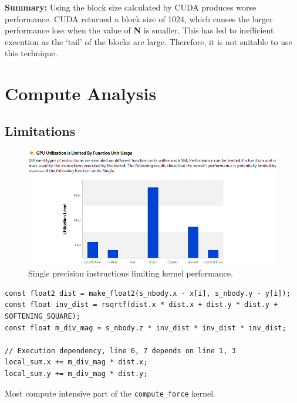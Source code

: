 \documentclass[12pt, a4paper]{article}
\begin{document}
\textbf{Summary:} Using the block size calculated by CUDA produces worse performance. CUDA returned
a block size of 1024, which causes the larger performance loss when the value of \textbf{N} is
smaller. This has led to inefficient execution as the `tail' of the blocks are large. Therefore, it
is not suitable to use this technique.

\pagebreak
\section{Compute Analysis}
\subsection{Limitations}
\begin{figure}[ht]
  \centering
  \includegraphics[width=\textwidth]{images/compute_analysis_shared_mem_compute_force.png}
  \caption{Single precision instructions limiting kernel performance.}
  \label{figure:compute_analysis_shared_mem_compute_force}
\end{figure}

\begin{listing}[H]
  \begin{verbatim}
const float2 dist = make_float2(s_nbody.x - x[i], s_nbody.y - y[i]);
const float inv_dist = rsqrtf(dist.x * dist.x + dist.y * dist.y + SOFTENING_SQUARE);
const float m_div_mag = s_nbody.z * inv_dist * inv_dist * inv_dist;

// Execution dependency, line 6, 7 depends on line 1, 3
local_sum.x += m_div_mag * dist.x;
local_sum.y += m_div_mag * dist.y;
  \end{verbatim}
  \caption{Most compute intensive part of the \texttt{compute\_force} kernel.}
  \label{listing:compute_analysis}
\end{listing}
\end{document}
